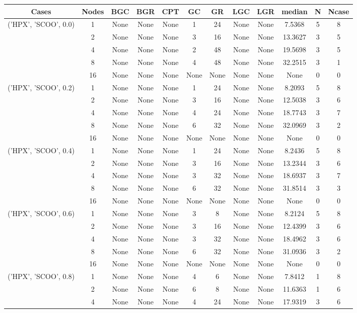 \begin{tabular}{cccccccccccc}
\hline
Cases & Nodes& BGC& BGR& CPT& GC& GR& LGC& LGR& median & N & Ncase \\
\hline
\multirow{5}{*}{('HPX', 'SCOO', 0.0)}& 1& None& None& None& 1& 24& None& None& 7.5368& 5& 8\\
& 2& None& None& None& 3& 16& None& None& 13.3627& 3& 5\\
& 4& None& None& None& 2& 48& None& None& 19.5698& 3& 5\\
& 8& None& None& None& 4& 48& None& None& 32.2515& 3& 1\\
& 16& None& None& None& None& None& None& None& None& 0& 0\\
\hline
\multirow{5}{*}{('HPX', 'SCOO', 0.2)}& 1& None& None& None& 1& 24& None& None& 8.2093& 5& 8\\
& 2& None& None& None& 3& 16& None& None& 12.5038& 3& 6\\
& 4& None& None& None& 4& 24& None& None& 18.7743& 3& 7\\
& 8& None& None& None& 6& 32& None& None& 32.0969& 3& 2\\
& 16& None& None& None& None& None& None& None& None& 0& 0\\
\hline
\multirow{5}{*}{('HPX', 'SCOO', 0.4)}& 1& None& None& None& 1& 24& None& None& 8.2436& 5& 8\\
& 2& None& None& None& 3& 16& None& None& 13.2344& 3& 6\\
& 4& None& None& None& 3& 32& None& None& 18.6937& 3& 7\\
& 8& None& None& None& 6& 32& None& None& 31.8514& 3& 3\\
& 16& None& None& None& None& None& None& None& None& 0& 0\\
\hline
\multirow{5}{*}{('HPX', 'SCOO', 0.6)}& 1& None& None& None& 3& 8& None& None& 8.2124& 5& 8\\
& 2& None& None& None& 3& 16& None& None& 12.4399& 3& 6\\
& 4& None& None& None& 3& 32& None& None& 18.4962& 3& 6\\
& 8& None& None& None& 6& 32& None& None& 31.0936& 3& 2\\
& 16& None& None& None& None& None& None& None& None& 0& 0\\
\hline
\multirow{5}{*}{('HPX', 'SCOO', 0.8)}& 1& None& None& None& 4& 6& None& None& 7.8412& 1& 8\\
& 2& None& None& None& 6& 8& None& None& 11.6363& 1& 6\\
& 4& None& None& None& 4& 24& None& None& 17.9319& 3& 6\\

\end{tabular}
